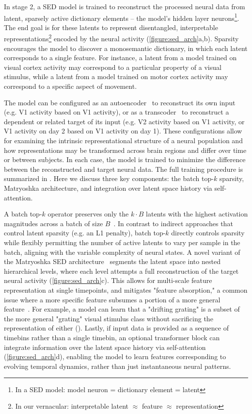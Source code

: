 In stage 2, a SED model is trained to reconstruct the processed neural data from latent, sparsely active dictionary elements -- the model's hidden layer neurons\footnote{In a SED model: model neuron = dictionary element = latent}. The end goal is for these latents to represent disentangled, interpretable representations\footnote{In our vernacular: interpretable latent $\approx$ feature $\approx$ representation} encoded by the neural activity (\autoref{figure:sed_arch}a,b). Sparsity encourages the model to discover a monosemantic dictionary, in which each latent corresponds to a single feature. For instance, a latent from a model trained on visual cortex activity may correspond to a particular property of a visual stimulus, while a latent from a model trained on motor cortex activity may correspond to a specific aspect of movement.

The model can be configured as an autoencoder~\cite{cunningham_2023_saes} to reconstruct its own input (e.g. V1 activity based on V1 activity), or as a transcoder~\cite{ dunefsky_2024_transcoders} to reconstruct a dependent or related target of its input (e.g. V2 activity based on V1 activity, or V1 activity on day 2 based on V1 activity on day 1). These configurations allow for examining the intrinsic representational structure of a neural population and how representations may be transformed across brain regions and differ over time or between subjects. In each case, the model is trained to minimize the difference between the reconstructed and target neural data. The full training procedure is summarized in . Here we discuss three key components: the batch top-$k$ sparsity, Matryoshka architecture, and integration over latent space history via self-attention.

A batch top-$k$ operator preserves only the $k \cdot B$ latents with the highest activation magnitudes across a batch of size $B$~\cite{bussmann_2024_batchtopk}. In contrast to indirect approaches that control latent sparsity (e.g. an L1 penalty), batch top-$k$ directly controls sparsity while flexibly permitting the number of active latents to vary per sample in the batch, aligning with the variable complexity of neural states. A novel variant of the Matryoshka SED architecture~\cite{bussmann_2025_msae} segments the latent space into nested hierarchical levels, where each level attempts a full reconstruction of the target neural activity (\autoref{figure:sed_arch}c). This allows for multi-scale feature representation at single timepoints, and mitigates "feature absorption," a common issue where a more specific feature subsumes a portion of a more general feature~\cite{chanin_2024_feature_absorption}. For example, a model can learn that a "drifting grating" is a subset of the more general "grating" visual stimulus class without sacrificing the representation of either (). Lastly, if input data is provided as a sequence of timebins rather than a single timebin, an optional transformer block can integrate information over the latent space history via self-attention (\autoref{figure:sed_arch}d), enabling the model to learn features corresponding to evolving temporal dynamics, rather than just instantaneous neural patterns.

